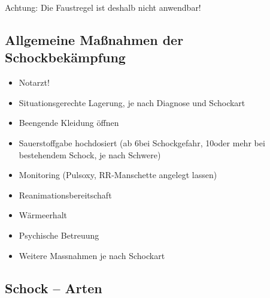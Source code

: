 Achtung:  Die Faustregel ist deshalb nicht anwendbar!



\subsection{Allgemeine Ma{\ss}nahmen der
Schockbek\"ampfung}\label{topic:schockbekaempfung}
\label{bkm:RefHeading38104902}


\begin{gMassnahmenEnv}
    \begin{itemize}
        \item Notarzt!
        \item Situationsgerechte  Lagerung, je nach Diagnose und Schockart
        \item Beengende Kleidung \"offnen
        \item Sauerstoffgabe hochdosiert (ab 6\gLMin bei Schockgefahr,
        10\gLMin oder mehr bei bestehendem Schock, je nach Schwere)
        \item Monitoring (Pulsoxy, RR-Manschette angelegt lassen)
        \item Reanimationsbereitschaft
        \item W\"armeerhalt
        \item Psychische Betreuung
        \item Weitere Massnahmen je nach Schockart
    \end{itemize}
\end{gMassnahmenEnv}

\subsection{Schock -- Arten}

